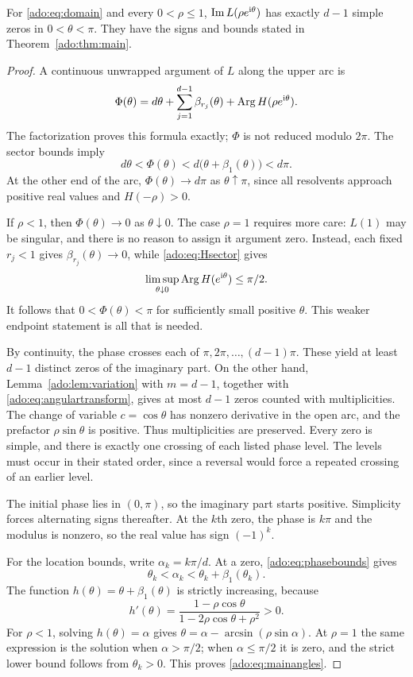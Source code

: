 \begin{theorem}
\label{ado:thm:angular}
For \eqref{ado:eq:domain} and every $0<\rho\le1$,
$\operatorname{Im} L(\rho e^{\mathrm{i}\theta})$ has exactly $d-1$ simple zeros in
$0<\theta<\pi$. They have the signs and bounds stated in
Theorem~\ref{ado:thm:main}.
\end{theorem}
\begin{proof}
A continuous unwrapped argument of $L$ along the upper arc is
\begin{equation}\label{ado:eq:unwrappedphase}
 \Phi(\theta)=d\theta+
       \sum_{j=1}^{d-1}\beta_{r_j}(\theta)
       +\operatorname{Arg} H(\rho e^{\mathrm{i}\theta}).
\end{equation}
The factorization proves this formula exactly; $\Phi$ is not reduced
modulo $2\pi$. The sector bounds imply
\begin{equation}\label{ado:eq:phasebounds}
 d\theta<\Phi(\theta)<d\bigl(\theta+\beta_1(\theta)\bigr)<d\pi.
\end{equation}
At the other end of the arc, $\Phi(\theta)\to d\pi$ as
$\theta\uparrow\pi$, since all resolvents approach positive real
values and $H(-\rho)>0$.

If $\rho<1$, then $\Phi(\theta)\to0$ as $\theta\downarrow0$.
The case $\rho=1$ requires more care: $L(1)$ may be singular, and
there is no reason to assign it argument zero. Instead, each fixed
$r_j<1$ gives $\beta_{r_j}(\theta)\to0$, while
\eqref{ado:eq:Hsector} gives
\[
 \limsup_{\theta\downarrow0}\operatorname{Arg} H(e^{\mathrm{i}\theta})\le\pi/2.
\]
It follows that $0<\Phi(\theta)<\pi$ for sufficiently small positive
$\theta$. This weaker endpoint statement is all that is needed.

By continuity, the phase crosses each of $\pi,2\pi,\ldots,(d-1)\pi$.
These yield at least $d-1$ distinct zeros of the imaginary part. On the
other hand, Lemma~\ref{ado:lem:variation} with $m=d-1$, together
with \eqref{ado:eq:angulartransform}, gives at most $d-1$ zeros
counted with multiplicities. The change of variable $c=\cos\theta$
has nonzero derivative in the open arc, and the prefactor
$\rho\sin\theta$ is positive. Thus multiplicities are preserved.
Every zero is simple, and there is exactly one crossing of each listed
phase level. The levels must occur in their stated order, since a
reversal would force a repeated crossing of an earlier level.

The initial phase lies in $(0,\pi)$, so the imaginary part starts
positive. Simplicity forces alternating signs thereafter. At the
$k$th zero, the phase is $k\pi$ and the modulus is nonzero, so the real
value has sign $(-1)^k$.

For the location bounds, write $\alpha_k=k\pi/d$. At a zero,
\eqref{ado:eq:phasebounds} gives
\[
 \theta_k<\alpha_k<\theta_k+\beta_1(\theta_k).
\]
The function $h(\theta)=\theta+\beta_1(\theta)$ is strictly
increasing, because
\[
 h'(\theta)=\frac{1-\rho\cos\theta}
                  {1-2\rho\cos\theta+\rho^2}>0.
\]
For $\rho<1$, solving $h(\theta)=\alpha$ gives
$\theta=\alpha-\arcsin(\rho\sin\alpha)$. At $\rho=1$ the same
expression is the solution when $\alpha>\pi/2$; when
$\alpha\le\pi/2$ it is zero, and the strict lower bound follows
from $\theta_k>0$. This proves \eqref{ado:eq:mainangles}.
\end{proof}
